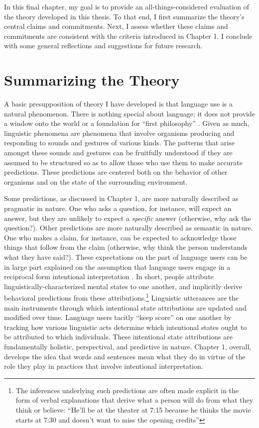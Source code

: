 In this final chapter, my goal is to provide an all-things-considered evaluation of the theory developed in this thesis. To that end, I first summarize the theory's central claims and commitments. Next, I assess whether these claims and commitments are consistent with the criteria introduced in Chapter 1. I conclude with some general reflections and suggestions for future research.

\section{Summarizing the Theory}

A basic presupposition of theory I have developed is that language use is a natural phenomenon. There is nothing special about language; it does not provide a window onto the world or a foundation for ``first philosophy'' \citep[see][]{Stanley:2008}. Given as much, linguistic phenomena are  phenomena that involve organisms producing and responding to sounds and gestures of various kinds. The patterns that arise amongst these sounds and gestures can be fruitfully understood if they are assumed to be structured so as to allow those who use them to make accurate predictions. These predictions are centered both on the behavior of other organisms and on the state of the surrounding environment. 

Some predictions, as discussed in Chapter 1, are more naturally described as pragmatic in nature. One who asks a question, for instance, will expect an answer, but they are unlikely to expect a \textit{specific} answer (otherwise, why ask the question?). Other predictions are more naturally described as semantic in nature. One who makes a claim, for instance, can be expected to acknowledge those things that follow from the claim (otherwise, why think the person understands what they have said?). These expectations on the part of language users can be in large part explained on the assumption that language users engage in a reciprocal form intentional interpretation \citep{Brandom:1994,Dennett:1987}. In short, people attribute linguistically-characterized mental states to one another, and implicitly derive behavioral predictions from these attributions.\footnote{The inferences underlying such predictions are often made explicit in the form of verbal explanations that derive what a person will do from what they think or believe: ``He'll be at the theater at 7:15 because he thinks the movie starts at 7:30 and doesn't want to miss the opening credits''} Linguistic utterances are the main instruments through which intentional state attributions are updated and modified over time. Language users tacitly ``keep score'' on one another by tracking how various linguistic acts determine which intentional states ought to be attributed to which individuals. These intentional state attributions are fundamentally holistic, perspectival, and predictive in nature. Chapter 1, overall, develops the idea that words and sentences mean what they do in virtue of the role they play in practices that involve intentional interpretation. 

